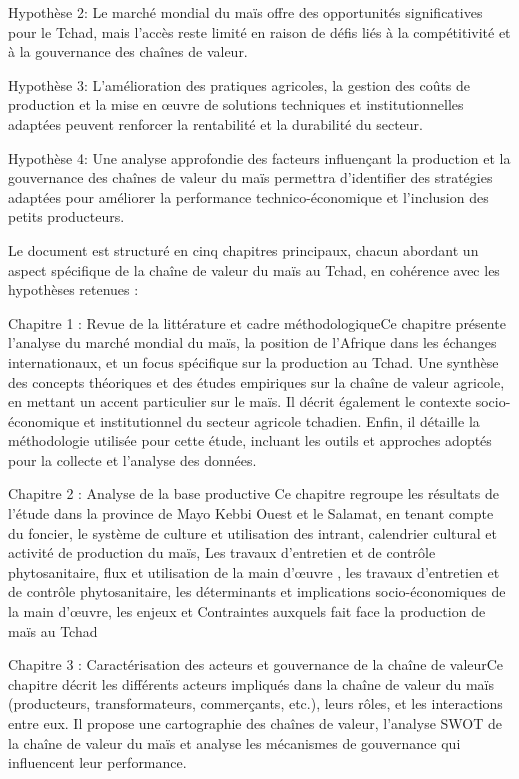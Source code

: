 \documentclass[12pt,oneside]{report}
\begin{document}
Hypothèse 2: Le marché mondial du maïs offre des opportunités significatives pour le Tchad, mais l'accès reste limité en raison de défis liés à la compétitivité et à la gouvernance des chaînes de valeur.

Hypothèse 3: L'amélioration des pratiques agricoles, la gestion des coûts de production et la mise en œuvre de solutions techniques et institutionnelles adaptées peuvent renforcer la rentabilité et la durabilité du secteur.

Hypothèse 4: Une analyse approfondie des facteurs influençant la production et la gouvernance des chaînes de valeur du maïs permettra d'identifier des stratégies adaptées pour améliorer la performance technico-économique et l'inclusion des petits producteurs.

Le document est structuré en cinq chapitres principaux, chacun abordant un aspect spécifique de la chaîne de valeur du maïs au Tchad, en cohérence avec les hypothèses retenues :

Chapitre 1 : Revue de la littérature et cadre méthodologiqueCe chapitre présente l’analyse du marché mondial du maïs, la position de l’Afrique dans les échanges internationaux, et un focus spécifique sur la production au Tchad. Une synthèse des concepts théoriques et des études empiriques sur la chaîne de valeur agricole, en mettant un accent particulier sur le maïs. Il décrit également le contexte socio-économique et institutionnel du secteur agricole tchadien. Enfin, il détaille la méthodologie utilisée pour cette étude, incluant les outils et approches adoptés pour la collecte et l’analyse des données.

Chapitre 2 : Analyse de la base productive  Ce chapitre regroupe les résultats de l’étude dans la province de Mayo Kebbi Ouest et le Salamat, en tenant compte du foncier, le système de culture et utilisation des intrant, calendrier cultural et activité de production du maïs, Les travaux d’entretien et de contrôle phytosanitaire,  flux et utilisation de la main d’œuvre , les travaux d’entretien et de contrôle phytosanitaire, les déterminants et implications socio-économiques de la main d’œuvre, les enjeux et Contraintes auxquels fait face la production de maïs au Tchad

Chapitre 3 : Caractérisation des acteurs et gouvernance de la chaîne de valeurCe chapitre décrit les différents acteurs impliqués dans la chaîne de valeur du maïs (producteurs, transformateurs, commerçants, etc.), leurs rôles, et les interactions entre eux. Il propose une cartographie des chaînes de valeur, l’analyse SWOT de la chaîne de valeur du maïs et analyse les mécanismes de gouvernance qui influencent leur performance.
\end{document}
